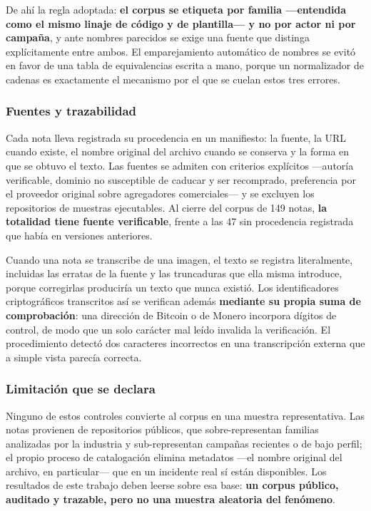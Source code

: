 De ahí la regla adoptada: \textbf{el corpus se etiqueta por familia —entendida como el mismo linaje de código y de plantilla— y no por actor ni por campaña}, y ante nombres parecidos se exige una fuente que distinga explícitamente entre ambos. El emparejamiento automático de nombres se evitó en favor de una tabla de equivalencias escrita a mano, porque un normalizador de cadenas es exactamente el mecanismo por el que se cuelan estos tres errores.

\subsubsection*{Fuentes y trazabilidad}

Cada nota lleva registrada su procedencia en un manifiesto: la fuente, la URL cuando existe, el nombre original del archivo cuando se conserva y la forma en que se obtuvo el texto. Las fuentes se admiten con criterios explícitos —autoría verificable, dominio no susceptible de caducar y ser recomprado, preferencia por el proveedor original sobre agregadores comerciales— y se excluyen los repositorios de muestras ejecutables. Al cierre del corpus de 149 notas, \textbf{la totalidad tiene fuente verificable}, frente a las 47 sin procedencia registrada que había en versiones anteriores.

Cuando una nota se transcribe de una imagen, el texto se registra literalmente, incluidas las erratas de la fuente y las truncaduras que ella misma introduce, porque corregirlas produciría un texto que nunca existió. Los identificadores criptográficos transcritos así se verifican además \textbf{mediante su propia suma de comprobación}: una dirección de Bitcoin o de Monero incorpora dígitos de control, de modo que un solo carácter mal leído invalida la verificación. El procedimiento detectó dos caracteres incorrectos en una transcripción externa que a simple vista parecía correcta.

\subsubsection*{Limitación que se declara}

Ninguno de estos controles convierte al corpus en una muestra representativa. Las notas provienen de repositorios públicos, que sobre-representan familias analizadas por la industria y sub-representan campañas recientes o de bajo perfil; el propio proceso de catalogación elimina metadatos —el nombre original del archivo, en particular— que en un incidente real sí están disponibles. Los resultados de este trabajo deben leerse sobre esa base: \textbf{un corpus público, auditado y trazable, pero no una muestra aleatoria del fenómeno}.
